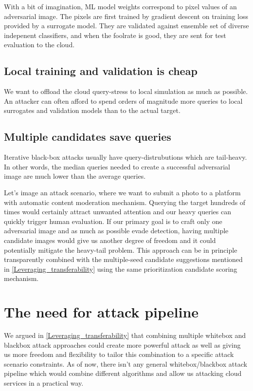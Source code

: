 With a bit of imagination, ML model weights correspond to pixel values of an adversarial image. The pixels are first trained by gradient descent on training loss provided by a surrogate model. They are validated against ensemble set of diverse indepenent classifiers, and when the foolrate is good, they are sent for test evaluation to the cloud. 

\subsection{Local training and validation is cheap}
We want to offload the cloud query-stress to local simulation as much as possible. An attacker can often afford to spend orders of magnitude more queries to local surrogates and validation models than to the actual target.

\subsection{Multiple candidates save queries}
Iterative black-box attacks usually have query-distrubutions which are tail-heavy. In other words, the median queries needed to create a successful adversarial image are much lower than the average queries.

Let's image an attack scenario, where we want to submit a photo to a platform with automatic content moderation mechanism. Querying the target hundreds of times would certainly attract unwanted attention and our heavy queries can quickly trigger human evaluation. If our primary goal is to craft only one adversarial image and as much as possible evade detection, having multiple candidate images would give us another degree of freedom and it could potentially mitigate the heavy-tail problem. This approach can be in principle transparently combined with the multiple-seed candidate suggestions mentioned in \ref{Leveraging_transferability} using the same prioritization candidate scoring mechanism.


\section{The need for attack pipeline}
We argued in \ref{Leveraging_transferability} that combining multiple whitebox and blackbox attack approaches could create more powerful attack as well as giving us more freedom and flexibility to tailor this combination to a specific attack scenario constraints. As of now, there isn't any general whitebox/blackbox attack pipeline which would combine different algorithms and allow us attacking cloud services in a practical way.

